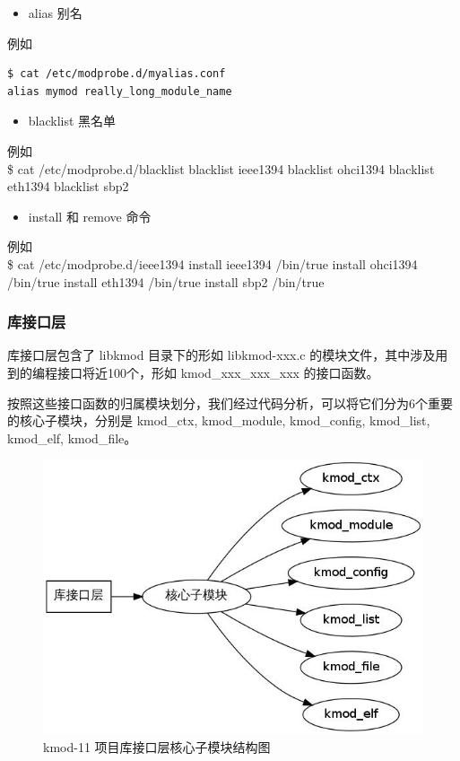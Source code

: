 \documentclass[11pt,a4paper]{article}
\makeatletter
\def\maxwidth{\ifdim\Gin@nat@width>\linewidth\linewidth
\else\Gin@nat@width\fi}
\let\Oldincludegraphics\includegraphics
\renewcommand{\includegraphics}[1]{\Oldincludegraphics[width=\maxwidth]{#1}}
\makeatother
\begin{document}
\begin{itemize}
\item
  alias 别名
\end{itemize}
例如

{\begin{shaded}\begin{verbatim}
$ cat /etc/modprobe.d/myalias.conf
alias mymod really_long_module_name
\end{verbatim}\end{shaded}}
\begin{itemize}
\item
  blacklist 黑名单
\end{itemize}
例如\\ \$ cat /etc/modprobe.d/blacklist blacklist ieee1394 blacklist
ohci1394 blacklist eth1394 blacklist sbp2

\begin{itemize}
\item
  install 和 remove 命令
\end{itemize}
例如\\ \$ cat /etc/modprobe.d/ieee1394 install ieee1394 /bin/true
install ohci1394 /bin/true install eth1394 /bin/true install sbp2
/bin/true

\subsubsection{库接口层}

库接口层包含了 libkmod 目录下的形如 libkmod-xxx.c
的模块文件，其中涉及用到的编程接口将近100个，形如 kmod\_xxx\_xxx\_xxx
的接口函数。

按照这些接口函数的归属模块划分，我们经过代码分析，可以将它们分为6个重要的核心子模块，分别是
kmod\_ctx, kmod\_module, kmod\_config, kmod\_list, kmod\_elf,
kmod\_file。

\begin{figure}[htbp]
\centering
\includegraphics{./figures/2-core.jpg}
\caption{kmod-11 项目库接口层核心子模块结构图}
\end{figure}
\end{document}
